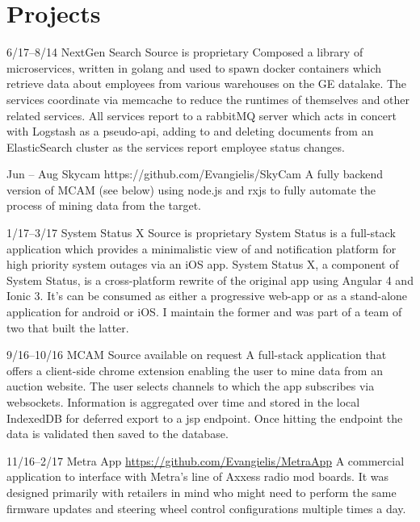 \documentclass[]{friggeri-cv}
\begin{document}


\section{Projects}

\begin{entrylist}


\entry
{6/17--8/14}
{NextGen Search}
{Source is proprietary}
{Composed a library of microservices, written in golang and used to spawn docker containers which retrieve data about employees from various warehouses on the GE datalake.  The services coordinate via memcache to reduce the runtimes of themselves and other related services.  All services report to a rabbitMQ server which acts in concert with Logstash as a pseudo-api, adding to and deleting documents from an ElasticSearch cluster as the services report employee status changes.}

\entry
{Jun -- Aug}
{Skycam}
{https://github.com/Evangielis/SkyCam}
{A fully backend version of MCAM (see below) using node.js and rxjs to fully automate the process of mining data from the target.}

\entry
{1/17--3/17}
{System Status X}
{Source is proprietary}
{System Status is a full-stack application which provides a minimalistic view of and notification platform for high priority system outages via an iOS app.  System Status X, a component of System Status, is a cross-platform rewrite of the original app using Angular 4 and Ionic 3.  It's can be consumed as either a progressive web-app or as a stand-alone application for android or iOS.  I maintain the former and was part of a team of two that built the latter.}

\entry
{9/16--10/16}
{MCAM}
{Source available on request}
{A full-stack application that offers a client-side chrome extension enabling the user to mine data from an auction website. The user selects channels to which the app subscribes via websockets. Information is aggregated over time and stored in the local IndexedDB for deferred export to a jsp endpoint.  Once hitting the endpoint the data is validated then saved to the database.}

\entry
{11/16--2/17}
{Metra App}
{\href{https://github.com/Evangielis/MetraApp}{https://github.com/Evangielis/MetraApp}}
{A commercial application to interface with Metra's line of Axxess radio mod boards.  It was designed primarily with retailers in mind who might need to perform the same firmware updates and steering wheel control configurations multiple times a day.}


\end{entrylist}
\end{document}
